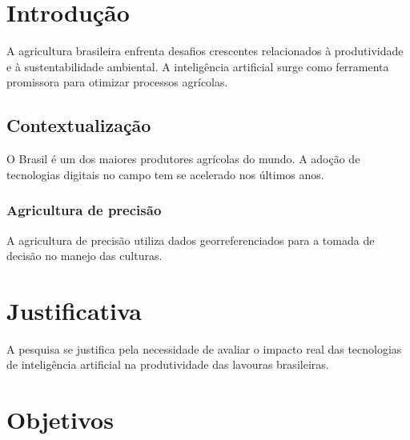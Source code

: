\documentclass{abnt-projeto-pesquisa}
\begin{document}
\pretextual

\imprimircapa

\imprimirfolhaderosto

\imprimirsumario

\textual

\chapter{Introdução}

A agricultura brasileira enfrenta desafios crescentes relacionados à
produtividade e à sustentabilidade ambiental. A inteligência artificial
surge como ferramenta promissora para otimizar processos agrícolas.

\section{Contextualização}

O Brasil é um dos maiores produtores agrícolas do mundo. A adoção de
tecnologias digitais no campo tem se acelerado nos últimos anos.

\subsection{Agricultura de precisão}

A agricultura de precisão utiliza dados georreferenciados para a tomada
de decisão no manejo das culturas.

\chapter{Justificativa}

A pesquisa se justifica pela necessidade de avaliar o impacto real das
tecnologias de inteligência artificial na produtividade das lavouras
brasileiras.

\chapter{Objetivos}
\end{document}
